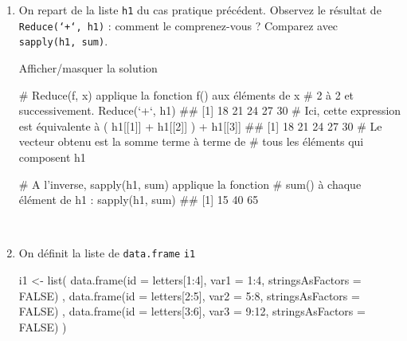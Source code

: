 \documentclass[12pt,]{article}
\newenvironment{Shaded}{}{}
\newcommand{\KeywordTok}[1]{\textcolor[rgb]{0.00,0.00,1.00}{{#1}}}
\newcommand{\DataTypeTok}[1]{{#1}}
\newcommand{\DecValTok}[1]{{#1}}
\newcommand{\StringTok}[1]{\textcolor[rgb]{0.00,0.50,0.50}{{#1}}}
\newcommand{\CommentTok}[1]{\textcolor[rgb]{0.00,0.50,0.00}{{#1}}}
\newcommand{\OtherTok}[1]{\textcolor[rgb]{1.00,0.25,0.00}{{#1}}}
\newcommand{\NormalTok}[1]{{#1}}
\begin{document}
\begin{enumerate}
\def\labelenumi{\alph{enumi}.}
\item
  On repart de la liste \texttt{h1} du cas pratique précédent. Observez
  le résultat de \texttt{Reduce(`+`,\ h1)} : comment le comprenez-vous ?
  Comparez avec \texttt{sapply(h1,\ sum)}.

  Afficher/masquer la solution

  \hypertarget{sol32}{}
\begin{Shaded}
\begin{Highlighting}[]
\CommentTok{# Reduce(f, x) applique la fonction f() aux éléments de x}
\CommentTok{# 2 à 2 et successivement. }
\KeywordTok{Reduce}\NormalTok{(}\StringTok{`}\DataTypeTok{+}\StringTok{`}\NormalTok{, h1)}
\NormalTok{## [1] 18 21 24 27 30}
\CommentTok{# Ici, cette expression est équivalente à }
\NormalTok{( h1[[}\DecValTok{1}\NormalTok{]] +}\StringTok{ }\NormalTok{h1[[}\DecValTok{2}\NormalTok{]] ) +}\StringTok{ }\NormalTok{h1[[}\DecValTok{3}\NormalTok{]]}
\NormalTok{## [1] 18 21 24 27 30}
\CommentTok{# Le vecteur obtenu est la somme terme à terme de }
\CommentTok{# tous les éléments qui composent h1}

\CommentTok{# A l'inverse, sapply(h1, sum) applique la fonction}
\CommentTok{# sum() à chaque élément de h1 : }
\KeywordTok{sapply}\NormalTok{(h1, sum)}
\NormalTok{## [1] 15 40 65}
\end{Highlighting}
\end{Shaded}

  ~
\item
  On définit la liste de \texttt{data.frame} \texttt{i1}

\begin{Shaded}
\begin{Highlighting}[]
\NormalTok{i1 <-}\StringTok{ }\KeywordTok{list}\NormalTok{(}
  \KeywordTok{data.frame}\NormalTok{(}\DataTypeTok{id =} \NormalTok{letters[}\DecValTok{1}\NormalTok{:}\DecValTok{4}\NormalTok{], }\DataTypeTok{var1 =} \DecValTok{1}\NormalTok{:}\DecValTok{4}\NormalTok{, }\DataTypeTok{stringsAsFactors =} \OtherTok{FALSE}\NormalTok{)}
  \NormalTok{, }\KeywordTok{data.frame}\NormalTok{(}\DataTypeTok{id =} \NormalTok{letters[}\DecValTok{2}\NormalTok{:}\DecValTok{5}\NormalTok{], }\DataTypeTok{var2 =} \DecValTok{5}\NormalTok{:}\DecValTok{8}\NormalTok{, }\DataTypeTok{stringsAsFactors =} \OtherTok{FALSE}\NormalTok{)}
  \NormalTok{, }\KeywordTok{data.frame}\NormalTok{(}\DataTypeTok{id =} \NormalTok{letters[}\DecValTok{3}\NormalTok{:}\DecValTok{6}\NormalTok{], }\DataTypeTok{var3 =} \DecValTok{9}\NormalTok{:}\DecValTok{12}\NormalTok{, }\DataTypeTok{stringsAsFactors =} \OtherTok{FALSE}\NormalTok{)}
\NormalTok{)}
\end{Highlighting}
\end{Shaded}


\end{enumerate}
\end{document}

